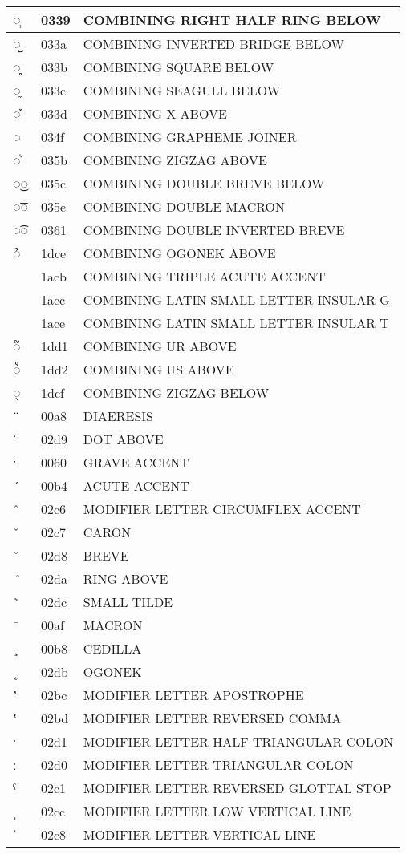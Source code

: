 \documentclass[12pt,letterpaper,openany]{book}
\begin{document}
\begin{center}
\begin{supertabular}{|m{0.25in}|m{0.5in}|m{4in}|}
◌̹ & 0339 & COMBINING RIGHT HALF RING BELOW\\\hline
◌̺ & 033a & COMBINING INVERTED BRIDGE BELOW\\\hline
◌̻ & 033b & COMBINING SQUARE BELOW\\\hline
◌̼ & 033c & COMBINING SEAGULL BELOW\\\hline
◌̽ & 033d & COMBINING X ABOVE\\\hline
◌͏ & 034f & COMBINING GRAPHEME JOINER\\\hline
◌͛ & 035b & COMBINING ZIGZAG ABOVE\\\hline
◌͜◌ & 035c & COMBINING DOUBLE BREVE BELOW\\\hline
◌͞◌ & 035e & COMBINING DOUBLE MACRON\\\hline
◌͡◌ & 0361 & COMBINING DOUBLE INVERTED BREVE\\\hline
◌᷎ & 1dce & COMBINING OGONEK ABOVE\\\hline
◌᫋ & 1acb & COMBINING TRIPLE ACUTE ACCENT\\\hline
◌ᫌ & 1acc & COMBINING LATIN SMALL LETTER INSULAR G\\\hline
◌ᫎ & 1ace & COMBINING LATIN SMALL LETTER INSULAR T\\\hline
◌᷑ & 1dd1 & COMBINING UR ABOVE\\\hline
◌᷒ & 1dd2 & COMBINING US ABOVE\\\hline
◌᷏ & 1dcf & COMBINING ZIGZAG BELOW\\\hline
¨ & 00a8 & DIAERESIS\\\hline
˙ & 02d9 & DOT ABOVE\\\hline
` & 0060 & GRAVE ACCENT\\\hline
´ & 00b4 & ACUTE ACCENT\\\hline
ˆ & 02c6 & MODIFIER LETTER CIRCUMFLEX ACCENT\\\hline
ˇ & 02c7 & CARON\\\hline
˘ & 02d8 & BREVE\\\hline
˚ & 02da & RING ABOVE\\\hline
˜ & 02dc & SMALL TILDE\\\hline
¯ & 00af & MACRON\\\hline
¸ & 00b8 & CEDILLA\\\hline
˛ & 02db & OGONEK\\\hline
ʼ & 02bc & MODIFIER LETTER APOSTROPHE\\\hline
ʽ & 02bd & MODIFIER LETTER REVERSED COMMA\\\hline
ˑ & 02d1 & MODIFIER LETTER HALF TRIANGULAR COLON\\\hline
ː & 02d0 & MODIFIER LETTER TRIANGULAR COLON\\\hline
ˁ & 02c1 & MODIFIER LETTER REVERSED GLOTTAL STOP\\\hline
ˌ & 02cc & MODIFIER LETTER LOW VERTICAL LINE\\\hline
ˈ & 02c8 & MODIFIER LETTER VERTICAL LINE\\\hline
\end{supertabular}
\end{center}
\end{document}
